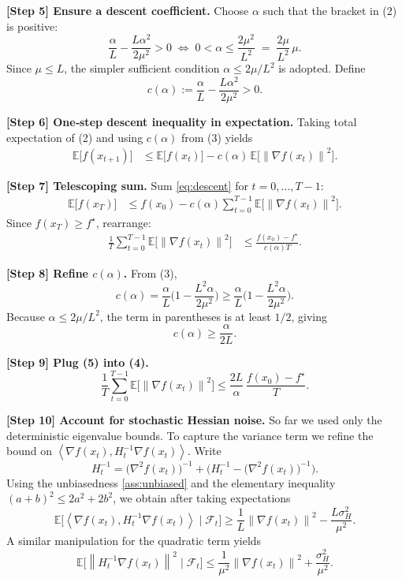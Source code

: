 \documentclass{article}
\newcommand{\E}{\mathbb{E}}
\newcommand{\norm}[1]{\left\|#1\right\|}
\newcommand{\ip}[2]{\left\langle #1,#2\right\rangle}
\begin{document}
\noindent\textbf{[Step 5] Ensure a descent coefficient.}  
Choose $\alpha$ such that the bracket in (2) is positive:
\[
\frac{\alpha}{L}-\frac{L\alpha^2}{2\mu^2}>0
\;\Longleftrightarrow\;
0<\alpha\le\frac{2\mu^2}{L^2}
\;=\;\frac{2\mu}{L^2}\,\mu .
\]
Since $\mu\le L$, the simpler sufficient condition
$\alpha\le 2\mu/L^2$ is adopted. Define
\[
c(\alpha):=\frac{\alpha}{L}-\frac{L\alpha^2}{2\mu^2}>0 .
\tag{3}
\]

\noindent\textbf{[Step 6] One‑step descent inequality in expectation.}
Taking total expectation of (2) and using $c(\alpha)$ from (3) yields
\begin{align}
\E\big[f(x_{t+1})\big]
&\le \E\big[f(x_t)\big]-c(\alpha)\,\E\!\big[\norm{\nabla f(x_t)}^2\big].
\label{eq:descent}
\end{align}

\noindent\textbf{[Step 7] Telescoping sum.}  
Sum \eqref{eq:descent} for $t=0,\dots,T-1$:
\begin{align}
\E\big[f(x_T)\big]
&\le f(x_0)-c(\alpha)\sum_{t=0}^{T-1}\E\!\big[\norm{\nabla f(x_t)}^2\big] .
\end{align}
Since $f(x_T)\ge f^\star$, rearrange:
\begin{align}
\frac{1}{T}\sum_{t=0}^{T-1}\E\!\big[\norm{\nabla f(x_t)}^2\big]
&\le \frac{f(x_0)-f^\star}{c(\alpha)T}.
\tag{4}
\end{align}

\noindent\textbf{[Step 8] Refine $c(\alpha)$.}  
From (3),
\[
c(\alpha)=\frac{\alpha}{L}\Big(1-\frac{L^2\alpha}{2\mu^2}\Big)
\ge \frac{\alpha}{L}\Big(1-\frac{L^2\alpha}{2\mu^2}\Big).
\]
Because $\alpha\le 2\mu/L^2$, the term in parentheses is at least $1/2$, giving
\[
c(\alpha)\ge \frac{\alpha}{2L}.
\tag{5}
\]

\noindent\textbf{[Step 9] Plug (5) into (4).}
\[
\frac{1}{T}\sum_{t=0}^{T-1}\E\!\big[\norm{\nabla f(x_t)}^2\big]
\le \frac{2L}{\alpha}\,\frac{f(x_0)-f^\star}{T}.
\tag{6}
\]

\noindent\textbf{[Step 10] Account for stochastic Hessian noise.}  
So far we used only the deterministic eigenvalue bounds. To capture the
variance term we refine the bound on $\ip{\nabla f(x_t)}{H_t^{-1}\nabla f(x_t)}$.
Write
\[
H_t^{-1}= \big(\nabla^2 f(x_t)\big)^{-1}
          +\big(H_t^{-1}-\big(\nabla^2 f(x_t)\big)^{-1}\big).
\]
Using the unbiasedness \ref{ass:unbiased} and the elementary inequality
$(a+b)^2\le 2a^2+2b^2$, we obtain after taking expectations
\[
\E\!\big[\ip{\nabla f(x_t)}{H_t^{-1}\nabla f(x_t)}\mid\mathcal{F}_t\big]
\ge \frac{1}{L}\norm{\nabla f(x_t)}^2
      -\frac{L\sigma_H^2}{\mu^2}.
\tag{7}
\]
A similar manipulation for the quadratic term yields
\[
\E\!\big[\norm{H_t^{-1}\nabla f(x_t)}^2\mid\mathcal{F}_t\big]
\le \frac{1}{\mu^2}\norm{\nabla f(x_t)}^2
      +\frac{\sigma_H^2}{\mu^2}.
\tag{8}
\]
\end{document}
